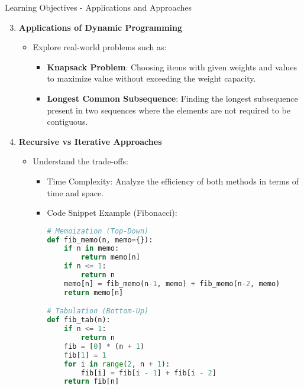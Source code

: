\documentclass[aspectratio=169]{beamer}
\begin{document}
\begin{frame}[fragile]{Learning Objectives - Applications and Approaches}
    \begin{enumerate}
        \setcounter{enumi}{2}
        \item \textbf{Applications of Dynamic Programming}
            \begin{itemize}
                \item Explore real-world problems such as:
                    \begin{itemize}
                        \item \textbf{Knapsack Problem}: Choosing items with given weights and values to maximize value without exceeding the weight capacity.
                        \item \textbf{Longest Common Subsequence}: Finding the longest subsequence present in two sequences where the elements are not required to be contiguous.
                    \end{itemize}
            \end{itemize}

        \item \textbf{Recursive vs Iterative Approaches}
            \begin{itemize}
                \item Understand the trade-offs:
                    \begin{itemize}
                        \item Time Complexity: Analyze the efficiency of both methods in terms of time and space.
                        \item Code Snippet Example (Fibonacci):
                            \begin{lstlisting}[language=Python]
# Memoization (Top-Down)
def fib_memo(n, memo={}):
    if n in memo:
        return memo[n]
    if n <= 1:
        return n
    memo[n] = fib_memo(n-1, memo) + fib_memo(n-2, memo)
    return memo[n]

# Tabulation (Bottom-Up)
def fib_tab(n):
    if n <= 1:
        return n
    fib = [0] * (n + 1)
    fib[1] = 1
    for i in range(2, n + 1):
        fib[i] = fib[i - 1] + fib[i - 2]
    return fib[n]
                            \end{lstlisting}
                    \end{itemize}
            \end{itemize}
    \end{enumerate}
\end{frame}
\end{document}
